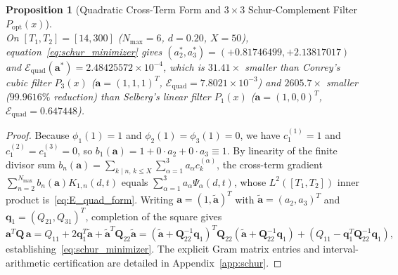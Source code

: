 \documentclass[11pt,reqno]{amsart}
\newtheorem{proposition}[theorem]{Proposition}
\theoremstyle{definition}
\theoremstyle{remark}
\numberwithin{equation}{section}
\begin{document}
\begin{proposition}[Quadratic Cross-Term Form and $3\times 3$ Schur-Complement Filter $P_{\mathrm{opt}}(x)$]
\begin{equation}
\end{equation}
On $[T_1, T_2] = [14, 300]$ ($N_{\max} = 6$, $d = 0.20$, $X = 50$), equation~\eqref{eq:schur_minimizer} gives $(a_2^*, a_3^*) = (+0.81746499,\allowbreak +2.13817017)$ and $\mathcal{E}_{\mathrm{quad}}(\mathbf{a}^*) = 2.48425572 \times 10^{-4}$, which is $31.41\times$ smaller than Conrey's cubic filter $P_3(x)$ ($\mathbf{a} = (1,1,1)^T$, $\mathcal{E}_{\mathrm{quad}} = 7.8021 \times 10^{-3}$) and $2605.7\times$ smaller ($99.9616\%$ reduction) than Selberg's linear filter $P_1(x)$ ($\mathbf{a} = (1,0,0)^T$, $\mathcal{E}_{\mathrm{quad}} = 0.647448$).
\end{proposition}

\begin{proof}
Because $\phi_1(1) = 1$ and $\phi_2(1) = \phi_3(1) = 0$, we have $c_1^{(1)} = 1$ and $c_1^{(2)} = c_1^{(3)} = 0$, so $b_1(\mathbf{a}) = 1 + 0\cdot a_2 + 0\cdot a_3 \equiv 1$. By linearity of the finite divisor sum $b_n(\mathbf{a}) = \sum_{k \mid n,\, k \le X} \sum_{\alpha=1}^3 a_\alpha c_k^{(\alpha)}$, the cross-term gradient $\sum_{n=2}^{N_{\max}} b_n(\mathbf{a}) K_{1,n}(d,t)$ equals $\sum_{\alpha=1}^3 a_\alpha \Psi_\alpha(d,t)$, whose $L^2([T_1, T_2])$ inner product is~\eqref{eq:E_quad_form}. Writing $\mathbf{a} = (1, \tilde{\mathbf{a}})^T$ with $\tilde{\mathbf{a}} = (a_2, a_3)^T$ and $\mathbf{q}_1 = (Q_{21}, Q_{31})^T$, completion of the square gives
\[
\mathbf{a}^T\mathbf{Q}\,\mathbf{a} = Q_{11} + 2\mathbf{q}_1^T\tilde{\mathbf{a}} + \tilde{\mathbf{a}}^T\mathbf{Q}_{22}\tilde{\mathbf{a}} = \left(\tilde{\mathbf{a}} + \mathbf{Q}_{22}^{-1}\mathbf{q}_1\right)^T \mathbf{Q}_{22}\left(\tilde{\mathbf{a}} + \mathbf{Q}_{22}^{-1}\mathbf{q}_1\right) + \left(Q_{11} - \mathbf{q}_1^T\mathbf{Q}_{22}^{-1}\mathbf{q}_1\right),
\]
establishing~\eqref{eq:schur_minimizer}. The explicit Gram matrix entries and interval-arithmetic certification are detailed in Appendix~\ref{app:schur}.
\end{proof}
\end{document}

